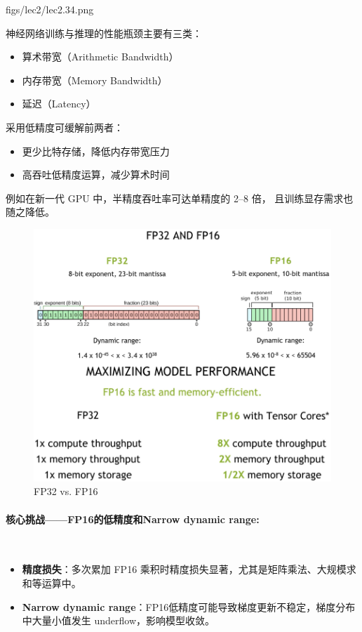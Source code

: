 \MarginImageWithNote
  {figs/lec2/lec2.34.png}
  {}
  {
\footnotesize
神经网络训练与推理的性能瓶颈主要有三类：
\begin{itemize}[leftmargin=0.5em]
    \item 算术带宽（Arithmetic Bandwidth）
    \item 内存带宽（Memory Bandwidth）
    \item 延迟（Latency）
\end{itemize}
采用低精度可缓解前两者：
\begin{itemize}[leftmargin=0.5em]
    \item 更少比特存储，降低内存带宽压力
    \item 高吞吐低精度运算，减少算术时间
\end{itemize}
例如在新一代 GPU 中，半精度吞吐率可达单精度的 2--8 倍，
且训练显存需求也随之降低。
}


\begin{figure}[htbp]
  \centering
  \includegraphics[width=0.9\linewidth]{figs/lec2/lec2.33.png}
  \caption{FP32 vs. FP16}
  \label{fig:FP32 vs. FP16}
\end{figure}



\paragraph{核心挑战——FP16的低精度和Narrow dynamic range:}~{}
\begin{itemize}
    \item \textbf{精度损失}：多次累加 FP16 乘积时精度损失显著，尤其是矩阵乘法、大规模求和等运算中。
    \item \textbf{Narrow dynamic range}：FP16低精度可能导致梯度更新不稳定，梯度分布中大量小值发生 underflow，影响模型收敛。
\end{itemize}

